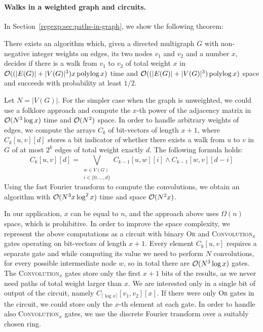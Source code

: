 \\

\paragraph{Walks in a weighted graph and circuits.} In Section~\ref{regexp:sec:paths-in-graph}, we show the following theorem:

\begin{thm}\label{thm:detecting_walk_specific_weight}
 There exists an algorithm which, given a directed multigraph $G$ with non-negative integer weights on edges, its two nodes $v_1$ and $v_2$ and a number $x$,  decides if there is a walk from $v_1$ to $v_2$ of total weight $x$ in~$\mathcal{O}((|E(G)|+|V(G)|^3)x\operatorname{polylog} x)$ time and $\mathcal{O}((|E(G)|+|V(G)|^3)\operatorname{polylog} x)$ space and succeeds with probability at least $1/2$.
\end{thm}

Let $N=|V(G)|$.
For the simpler case when the graph is unweighted, we could use a folklore approach and compute the $x$-th power of the adjacency matrix in $\mathcal{O}(N^3\log x)$ time and $\mathcal{O}(N^2)$ space.
In order to handle arbitrary weights of edges, we compute the arrays $C_k$ of bit-vectors of length $x+1$, where $C_k[u,v][d]$ stores a bit indicator of whether there exists a walk from $u$ to $v$ in $G$ of at most $2^k$ edges of total weight exactly $d$. The following formula holds:
$$C_k[u,v][d]=\bigvee_{\substack{w\in V(G) \\  i\in \{0,\ldots,d\}}} C_{k-1}[u,w][i] \wedge C_{k-1}[w,v][d-i]$$
Using the fast Fourier transform to compute the convolutions, we obtain an algorithm with $\mathcal{O}(N^3x\log^2x)$ time and space $\mathcal{O}(N^2x)$. 

In our application, $x$ can be equal to $n$, and the approach above uses $\Omega(n)$ space, which is prohibitive. 
In order to improve the space complexity, we represent the above computations as a circuit with binary \textsc{Or} and \textsc{Convolution}$_x$ gates operating on bit-vectors of length $x+1$.
Every element $C_k[u,v]$ requires a separate gate and while computing its value we need to perform $N$ convolutions, for every possible intermediate node $w$, so in total there are $\mathcal{O}(N^3\log x)$ gates.
The \textsc{Convolution}$_x$ gates store only the first $x+1$ bits of the results, as we never need paths of total weight larger than $x$.
We are interested only in a single bit of output of the circuit, namely $C_{\lceil\log x\rceil}[v_1,v_2][x]$. If there were only \textsc{Or} gates in the circuit, we could store only the $x$-th element at each gate.
In order to handle also \textsc{Convolution}$_x$ gates, we use the discrete Fourier transform over a suitably chosen ring.

